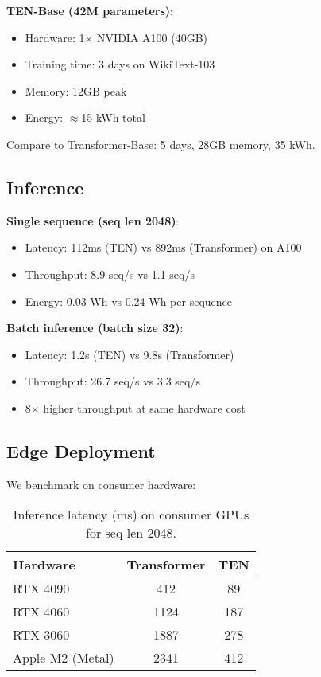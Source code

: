 \documentclass[11pt,letterpaper]{article}
\begin{document}
\textbf{TEN-Base (42M parameters)}:
\begin{itemize}
    \item Hardware: 1× NVIDIA A100 (40GB)
    \item Training time: 3 days on WikiText-103
    \item Memory: 12GB peak
    \item Energy: $\approx$15 kWh total
\end{itemize}

Compare to Transformer-Base: 5 days, 28GB memory, 35 kWh.

\subsection{Inference}

\textbf{Single sequence (seq len 2048)}:
\begin{itemize}
    \item Latency: 112ms (TEN) vs 892ms (Transformer) on A100
    \item Throughput: 8.9 seq/s vs 1.1 seq/s
    \item Energy: 0.03 Wh vs 0.24 Wh per sequence
\end{itemize}

\textbf{Batch inference (batch size 32)}:
\begin{itemize}
    \item Latency: 1.2s (TEN) vs 9.8s (Transformer)
    \item Throughput: 26.7 seq/s vs 3.3 seq/s
    \item 8× higher throughput at same hardware cost
\end{itemize}

\subsection{Edge Deployment}

We benchmark on consumer hardware:

\begin{table}[h]
\centering
\caption{Inference latency (ms) on consumer GPUs for seq len 2048.}
\begin{tabular}{lcc}
\toprule
\textbf{Hardware} & \textbf{Transformer} & \textbf{TEN} \\
\midrule
RTX 4090 & 412 & 89 \\
RTX 4060 & 1124 & 187 \\
RTX 3060 & 1887 & 278 \\
Apple M2 (Metal) & 2341 & 412 \\
\bottomrule
\end{tabular}
\end{table}
\end{document}
